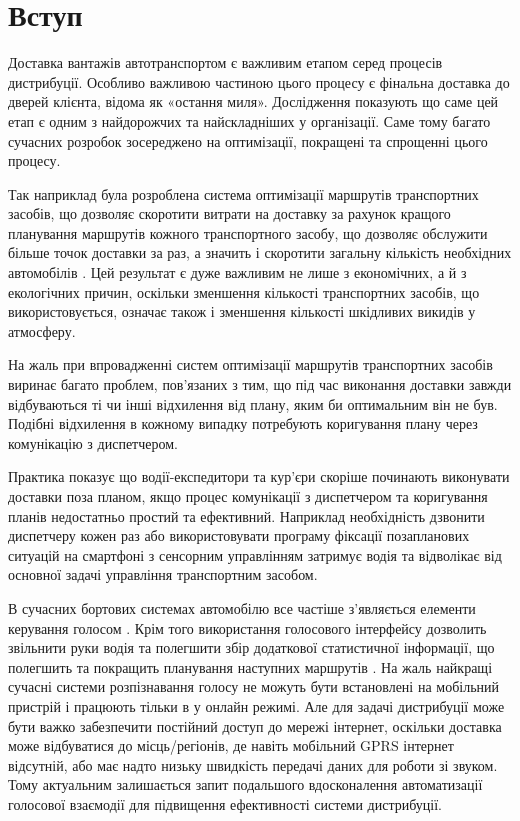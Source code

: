 \section{Вступ}

Доставка вантажів автотранспортом є важливим етапом серед процесів дистрибуції. Особливо важливою частиною цього процесу є фінальна доставка до дверей клієнта, відома як «остання миля». Дослідження показують що саме цей етап є одним з найдорожчих та найскладніших у організації. Саме тому багато сучасних розробок зосереджено на оптимізації, покращені та спрощенні цього процесу.

Так наприклад була розроблена система оптимізації маршрутів транспортних засобів, що дозволяє скоротити витрати на доставку за рахунок кращого планування маршрутів кожного транспортного засобу, що дозволяє обслужити більше точок доставки за раз, а значить і скоротити загальну кількість необхідних автомобілів \cite{art1}. Цей результат є дуже важливим не лише з економічних, а й з екологічних причин, оскільки зменшення кількості транспортних засобів, що використовується, означає також і зменшення кількості шкідливих викидів у атмосферу.

На жаль при впровадженні систем оптимізації маршрутів транспортних засобів виринає багато проблем, пов’язаних з тим, що під час виконання доставки завжди відбуваються ті чи інші відхилення від плану, яким би оптимальним він не був. Подібні відхилення в кожному випадку потребують коригування плану через комунікацію з диспетчером.

Практика показує що водії-експедитори та кур'єри скоріше починають виконувати доставки поза планом, якщо процес комунікації з диспетчером та коригування планів недостатньо простий та ефективний. Наприклад необхідність дзвонити диспетчеру кожен раз або використовувати програму фіксації позапланових ситуацій на смартфоні з сенсорним управлінням затримує водія та відволікає від основної задачі управління транспортним засобом.

В сучасних бортових системах автомобілю все частіше з'являється елементи керування голосом \cite{art2,Kravchenko_2009,Heisterkamp_2001}. Крім того використання голосового інтерфейсу дозволить звільнити руки водія та полегшити збір додаткової статистичної інформації, що полегшить та покращить планування наступних маршрутів \cite{conf9}. На жаль найкращі сучасні системи розпізнавання голосу не можуть бути встановлені на мобільний пристрій і працюють тільки в у онлайн режимі. Але для задачі дистрибуції може бути важко забезпечити постійний доступ до мережі інтернет, оскільки доставка може відбуватися до місць/регіонів, де навіть мобільний GPRS інтернет відсутній, або має надто низьку швидкість передачі даних для роботи зі звуком. Тому актуальним залишається запит подальшого вдосконалення автоматизації голосової взаємодії для підвищення ефективності системи дистрибуції.

